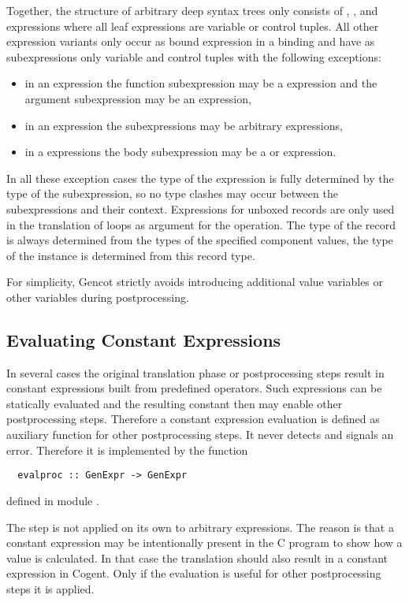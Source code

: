 Together, the structure of arbitrary deep syntax trees only consists of , , and  expressions
where all leaf expressions are variable or control tuples. All other expression variants only occur as bound expression in
a binding and have as subexpressions only variable and control tuples with the following exceptions:
\begin{itemize}
\item in an  expression the function subexpression may be a  expression and the argument subexpression
may be an  expression,
\item in an  expression the subexpressions may be arbitrary expressions,
\item in a  expressions the body subexpression may be a  or  expression.
\end{itemize}
In all these exception cases the type of the expression is fully determined by the type of the subexpression, so no type
clashes may occur between the subexpressions and their context. Expressions for unboxed records are only used in the translation
of loops as argument for the  operation. The type of the record is always determined from the types of the
specified component values, the type of the  instance is determined from this record type.

For simplicity, Gencot strictly avoids introducing additional value variables or other variables during postprocessing.

\subsection{Evaluating Constant Expressions}
\label{impl-post-const}

In several cases the original translation phase or postprocessing steps result in constant expressions built
from predefined operators. Such expressions can be statically evaluated and the resulting constant then may
enable other postprocessing steps. Therefore a constant expression evaluation is defined as auxiliary 
function for other postprocessing steps. It never detects and signals an error. Therefore it is implemented
by the function
\begin{verbatim}
  evalproc :: GenExpr -> GenExpr
\end{verbatim}
defined in module .

The  step is not applied on its own to arbitrary expressions. The reason is that a constant
expression may be intentionally present in the C program to show how a value is calculated. In that case the 
translation should also result in a constant expression in Cogent. Only if the evaluation is useful for other 
postprocessing steps it is applied.

